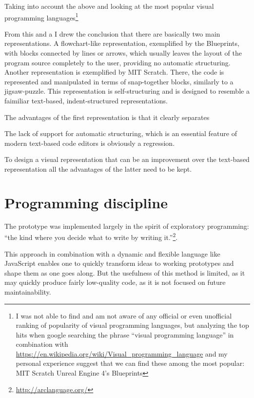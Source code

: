 Taking into account the above and looking at the most popular visual programming
languages\footnote{I was not able to find and am not aware of any official or
  even unofficial ranking of popularity of visual programming languages, but
  analyzing the top hits when google searching the phrase ``visual programming
  language'' in combination with
  \url{https://en.wikipedia.org/wiki/Visual_programming_language} and my
  personal experience suggest that we can find these among the most popular: MIT
  Scratch Unreal Engine 4's Blueprints}

From this and a I drew the conclusion that there are basically two main
representations. A flowchart-like representation, exemplified by the Blueprints,
with blocks connected by lines or arrows, which usually leaves the layout of the
program source completely to the user, providing no automatic
structuring. Another representation is exemplified by MIT Scratch. There, the
code is represented and manipulated in terms of snap-together blocks, similarly
to a jigsaw-puzzle. This representation is self-structuring and is designed to
resemble a faimiliar text-based, indent-structured representations.

The advantages of the first representation is that it clearly separates

The lack of support for automatic structuring, which is an essential feature of
modern text-based code editors is obviously a regression.

To design a visual representation that can be an improvement over the text-based
representation all the advantages of the latter need to be kept.


\section{Programming discipline}
The prototype was implemented largely in the spirit of exploratory programming:
``the kind where you decide what to write by writing
it.''\footnote{\url{http://arclanguage.org/}}.

This approach in combination with a dynamic and flexible language like
JavaScript enables one to quickly transform ideas to working prototypes and
shape them as one goes along. But the usefulness of this method is limited, as
it may quickly produce fairly low-quality code, as it is not focused on future
maintainability.
